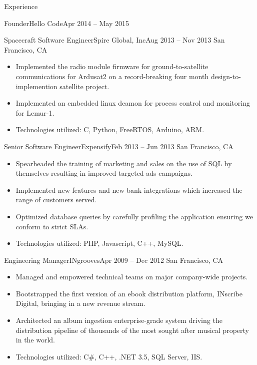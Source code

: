 \documentclass[]{mcdowellcv}
\begin{document}
\begin{cvsection}{Experience}
\begin{cvsubsection}{Founder}{Hello Code}{Apr 2014 -- May 2015}
\begin{itemize}
		\end{itemize}
	\end{cvsubsection}
	\begin{cvsubsection}{Spacecraft Software Engineer}{Spire Global, Inc}{Aug 2013 -- Nov 2013}
		San Francisco, CA
		\begin{itemize}%
			\item Implemented the radio module firmware for ground-to-satellite communications for Ardusat2 on a record-breaking four month design-to-implemention satellite project.
			\item Implemented an embedded linux deamon for process control and monitoring for Lemur-1.
			\item Technologies utilized: C, Python, FreeRTOS, Arduino, ARM.
		\end{itemize}
	\end{cvsubsection}
	\begin{cvsubsection}{Senior Software Engineer}{Expensify}{Feb 2013 -- Jun 2013}
		San Francisco, CA
		\begin{itemize}%
			\item Spearheaded the training of marketing and sales on the use of SQL by themselves resulting in improved targeted ads campaigns.
			\item Implemented new features and new bank integrations which increased the range of customers served.
			\item Optimized database queries by carefully profiling the application ensuring we conform to strict SLAs.
			\item Technologies utilized: PHP, Javascript, C++, MySQL.
		\end{itemize}
	\end{cvsubsection}
	\begin{cvsubsection}{Engineering Manager}{INgrooves}{Apr 2009 -- Dec 2012}
		San Francisco, CA
		\begin{itemize}%
			\item Managed and empowered technical teams on major company-wide projects.
			\item Bootstrapped the first version of an ebook distribution platform, INscribe Digital, bringing in a new revenue stream.
			\item Architected an album ingestion enterprise-grade system driving the distribution pipeline of thousands of the most sought after musical property in the world.
			\item Technologies utilized: C\#, C++, .NET 3.5, SQL Server, IIS.
		\end{itemize}

\end{cvsubsection}
\end{cvsection}
\end{document}
